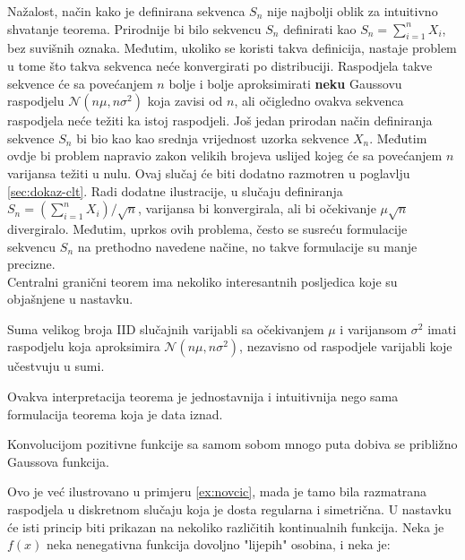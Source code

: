 Nažalost, način kako je definirana sekvenca $S_n$ nije najbolji oblik za
intuitivno shvatanje teorema. Prirodnije bi bilo sekvencu $S_n$ definirati kao
$S_n=\sum_{i=1}^{n} X_i$, bez suvišnih oznaka. Međutim, ukoliko se koristi takva
definicija, nastaje problem u tome što takva sekvenca neće konvergirati po
distribuciji. Raspodjela takve sekvence će sa povećanjem $n$ bolje i bolje
aproksimirati \textbf{neku} Gaussovu raspodjelu $\mathcal{N}(n\mu,n\sigma^2)$
koja zavisi od $n$, ali očigledno ovakva sekvenca raspodjela neće težiti ka
istoj raspodjeli. Još jedan prirodan način definiranja sekvence $S_n$ bi bio kao
kao srednja vrijednost uzorka sekvence $X_n$. Međutim ovdje bi problem napravio
zakon velikih brojeva uslijed kojeg će sa povećanjem $n$ varijansa težiti u
nulu. Ovaj slučaj će biti dodatno razmotren u poglavlju \ref{sec:dokaz-clt}.
Radi dodatne ilustracije, u slučaju definiranja $S_n = \left(\sum_{i=1}^n
X_i\right)/\sqrt{n}$, varijansa bi konvergirala, ali bi očekivanje $\mu
\sqrt{n}$ divergiralo.  Međutim, uprkos ovih problema, često se susreću
formulacije  sekvencu $S_n$ na prethodno navedene načine, no takve formulacije
su manje precizne. \\

Centralni granični teorem ima nekoliko interesantnih posljedica koje su
objašnjene u nastavku.

\setcounter{corollary}{0}
\begin{corollary}

  Suma velikog broja IID slučajnih varijabli sa očekivanjem $\mu$ i varijansom
  $\sigma^2$ imati raspodjelu koja aproksimira $\mathcal{N}(n\mu, n\sigma^2)$,
  nezavisno od raspodjele varijabli koje učestvuju u sumi. 

\end{corollary}

Ovakva interpretacija teorema je jednostavnija i intuitivnija nego sama
formulacija teorema koja je data iznad.



\begin{corollary}
  Konvolucijom pozitivne funkcije sa samom sobom mnogo puta dobiva se približno
  Gaussova funkcija.
\end{corollary}

Ovo je već ilustrovano u primjeru \ref{ex:novcic}, mada je tamo bila razmatrana
raspodjela u diskretnom slučaju koja je dosta regularna i simetrična. U nastavku
će isti princip biti prikazan na nekoliko različitih kontinualnih funkcija. Neka
je $f(x)$ neka nenegativna funkcija dovoljno "lijepih" osobina, i neka je:

